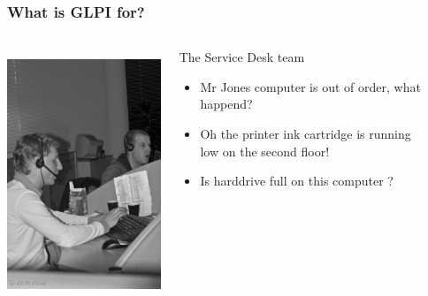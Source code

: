 \documentclass{beamer}
\begin{document}
\begin{frame}
    \frametitle{What is GLPI for?}

 \begin{columns}
 \begin{column}{0.1\textwidth}
         \includegraphics[height=7.5cm]{./pics/helpdesk.jpg}
 \end{column}
 \begin{column}{1\textwidth}

    \begin{block}{The Service Desk team}
        \begin{itemize}
            \item Mr Jones computer is out of order, what happend?
            \item Oh the printer ink cartridge is running \\
                low on the second floor!
            \item Is harddrive full on this computer ?
        \end{itemize}
    \end{block}
 \end{column}
\end{columns}


\end{frame}
\end{document}
